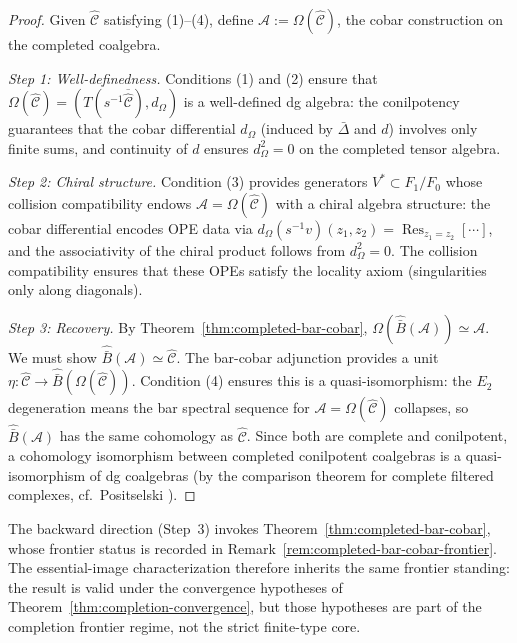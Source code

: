 \begin{proof}
Given $\widehat{\mathcal{C}}$ satisfying (1)--(4), define $\mathcal{A} := \Omega(\widehat{\mathcal{C}})$, the cobar construction on the completed coalgebra.

\emph{Step 1: Well-definedness.}  Conditions (1) and (2) ensure that $\Omega(\widehat{\mathcal{C}}) = (T(s^{-1}\overline{\widehat{\mathcal{C}}}), d_\Omega)$ is a well-defined dg algebra: the conilpotency guarantees that the cobar differential $d_\Omega$ (induced by $\bar{\Delta}$ and $d$) involves only finite sums, and continuity of $d$ ensures $d_\Omega^2 = 0$ on the completed tensor algebra.

\emph{Step 2: Chiral structure.}  Condition (3) provides generators $V^* \subset F_1/F_0$ whose collision compatibility endows $\mathcal{A} = \Omega(\widehat{\mathcal{C}})$ with a chiral algebra structure: the cobar differential encodes OPE data via $d_\Omega(s^{-1}v)(z_1, z_2) = \operatorname{Res}_{z_1 = z_2}[\cdots]$, and the associativity of the chiral product follows from $d_\Omega^2 = 0$.  The collision compatibility ensures that these OPEs satisfy the locality axiom (singularities only along diagonals).

\emph{Step 3: Recovery.}  By Theorem~\ref{thm:completed-bar-cobar}, $\Omega(\widehat{\bar{B}}(\mathcal{A})) \simeq \mathcal{A}$.  We must show $\widehat{\bar{B}}(\mathcal{A}) \simeq \widehat{\mathcal{C}}$.  The bar-cobar adjunction provides a unit $\eta: \widehat{\mathcal{C}} \to \widehat{\bar{B}}(\Omega(\widehat{\mathcal{C}}))$.  Condition (4) ensures this is a quasi-isomorphism: the $E_2$ degeneration means the bar spectral sequence for $\mathcal{A} = \Omega(\widehat{\mathcal{C}})$ collapses, so $\widehat{\bar{B}}(\mathcal{A})$ has the same cohomology as $\widehat{\mathcal{C}}$.  Since both are complete and conilpotent, a cohomology isomorphism between completed conilpotent coalgebras is a quasi-isomorphism of dg coalgebras (by the comparison theorem for complete filtered complexes, cf.\ Positselski \cite{Positselski11}).
\end{proof}

\begin{remark}\label{rem:koszul-dual-characterization-frontier}
The backward direction (Step~3) invokes
Theorem~\ref{thm:completed-bar-cobar}, whose frontier status is
recorded in Remark~\ref{rem:completed-bar-cobar-frontier}.  The
essential-image characterization therefore inherits the same
frontier standing: the result is valid under the convergence
hypotheses of Theorem~\ref{thm:completion-convergence}, but those
hypotheses are part of the completion frontier regime, not the strict
finite-type core.
\end{remark}

